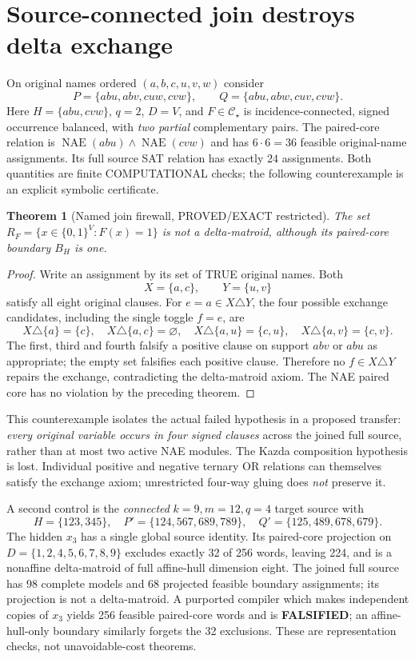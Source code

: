 \documentclass[11pt]{article}
\newtheorem{theorem}{Theorem}
\newcommand{\CS}{\mathcal C_{\star}}
\newcommand{\NAE}{\operatorname{NAE}}
\begin{document}
\section{Source-connected join destroys delta exchange}
On original names ordered $(a,b,c,u,v,w)$ consider
\[
P=\{abu,abv,cuw,cvw\},\qquad Q=\{abu,abw,cuv,cvw\}.
\]
Here $H=\{abu,cvw\}$, $q=2$, $D=V$, and $F\in\CS$ is incidence-connected, signed occurrence balanced, with \emph{two partial} complementary pairs. The paired-core relation is $\NAE(abu)\land\NAE(cvw)$ and has $6\cdot6=36$ feasible original-name assignments. Its full source SAT relation has exactly $24$ assignments. Both quantities are finite COM\-PUTATIONAL checks; the following counterexample is an explicit symbolic certificate.

\begin{theorem}[Named join firewall, PROVED/EXACT restricted]
The set $R_F=\{x\in\{0,1\}^V:F(x)=1\}$ is \emph{not} a delta-matroid, although its paired-core boundary $B_H$ is one.
\end{theorem}
\begin{proof}
Write an assignment by its set of TRUE original names. Both
\[
X=\{a,c\},\qquad Y=\{u,v\}
\]
satisfy all eight original clauses. For $e=a\in X\triangle Y$, the four possible exchange candidates, including the single toggle $f=e$, are
\[
X\triangle\{a\}=\{c\},\quad
X\triangle\{a,c\}=\varnothing,\quad
X\triangle\{a,u\}=\{c,u\},\quad
X\triangle\{a,v\}=\{c,v\}.
\]
The first, third and fourth falsify a positive clause on support $abv$ or $abu$ as appropriate; the empty set falsifies each positive clause. Therefore no $f\in X\triangle Y$ repairs the exchange, contradicting the delta-matroid axiom. The NAE paired core has no violation by the preceding theorem.
\end{proof}
This counterexample isolates the actual failed hypothesis in a proposed transfer: \emph{every original variable occurs in four signed clauses} across the joined full source, rather than at most two active NAE modules. The Kazda composition hypothesis is lost. Individual positive and negative ternary OR relations can themselves satisfy the exchange axiom; unrestricted four-way gluing does \emph{not} preserve it.

A second control is the \emph{connected} $k=9,m=12,q=4$ target source with
\[
H=\{123,345\},\quad
P'=\{124,567,689,789\},\quad
Q'=\{125,489,678,679\}.
\]
The hidden $x_3$ has a single global source identity. Its paired-core projection on $D=\{1,2,4,5,6,7,8,9\}$ excludes exactly 32 of 256 words, leaving 224, and is a nonaffine delta-matroid of full affine-hull dimension eight. The joined full source has 98 complete models and 68 projected feasible boundary assignments; its projection is not a delta-matroid. A purported compiler which makes independent copies of $x_3$ yields 256 feasible paired-core words and is \textbf{FALSIFIED}; an affine-hull-only boundary similarly forgets the 32 exclusions. These are representation checks, not unavoidable-cost theorems.
\end{document}

